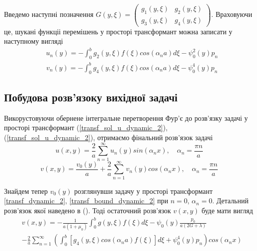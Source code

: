 Введемо наступні позначення $G(y, \xi) = \begin{pmatrix}
    g_1(y,\xi) & g_2(y,\xi) \\
    g_3(y,\xi) & g_4(y,\xi)
\end{pmatrix}$. Враховуючи це, шукані функціі перемішень у просторі трансформант можна записати у наступному вигляді
\begin{align}\label{transf_sol_u_dynamic_2}
    &u_n(y) = -\int_0^b g_2(y, \xi)f(\xi) cos(\alpha_n a) d\xi - \psi_0^2(y) p_n
\end{align}
\begin{align}\label{transf_sol_v_dynamic_2}
    &v_n(y) = -\int_0^b g_4(y, \xi)f(\xi) cos(\alpha_n a) d\xi - \psi_0^4(y) p_n
\end{align}

\subsection{Побудова розв'язоку вихідної задачі}
Викорустовуючи обернене інтегральне перетворення Фур'є до розв'язку задачі у просторі трансформант
(\ref{transf_sol_u_dynamic_2}), (\ref{transf_sol_u_dynamic_2}), отримаємо фінальний розв'язок задачі
\begin{equation}
    u(x,y) = \frac{2}{a} \sum_{n=1}^{\infty} u_n(y) sin(\alpha_n x), \quad \alpha_n = \frac{\pi n}{a}
\end{equation}
\begin{equation}
    v(x,y) = \frac{v_0(y)}{a} + \frac{2}{a} \sum_{n=1}^{\infty} v_n(y) cos(\alpha_n x), \quad \alpha_n = \frac{\pi n}{a}
\end{equation}

Знайдем тепер $v_0(y)$ розглянувши задачу у просторі трансформант \eqref{transf_dynamic_2}, \eqref{transf_bound_dynamic_2} при $n=0$, $\alpha_n = 0$.
Детальний розв'язок якої наведено в (). Тоді остаточний розв'язок $v(x,y)$ буде мати вигляд
\begin{align}
    &v(x,y) = -\frac{1}{a(1+\mu_0)} \int_{0}^{b}g(y,\xi) f(\xi) d\xi - \psi_0(y) \frac{p_0}{a(2G + \lambda)} \nonumber \\
    &- \frac{2}{a} \sum_{n=1}^{\infty} \left( \int_0^b \left[g_4(y, \xi) cos(\alpha_n a) f(\xi) \right]d\xi + \psi_0^4(y) p_n  \right) cos(\alpha_n x)
\end{align}
